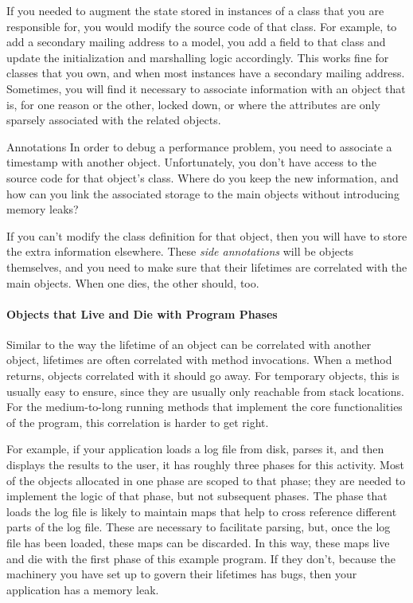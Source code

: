 If you needed to augment the state stored in instances of a class that you are
responsible for, you would modify the source code of that class. For example, to
add a secondary mailing address to a  model, you add a field to
that class and update the initialization and marshalling logic accordingly. This
works fine for classes that you own, and when most  instances have
a secondary mailing address. Sometimes, you will find it necessary to associate
information with an object that is, for one reason or the other, locked down, or
where the attributes are only sparsely associated with the related objects.

\begin{example}{Annotations}
In order to debug a performance problem, you need to associate a timestamp with
another object. Unfortunately, you don't have access to the source code for
that object's class. Where do you keep the new information, and how can you
link the associated storage to the main objects without introducing memory
leaks?
\end{example}

If you can't modify the class definition for that object, then you will have to
store the extra information elsewhere. These \emph{side annotations} will be objects themselves, and you need to make sure that their
lifetimes are correlated with the main objects. When one dies, the other
should, too.

\paragraph{Objects that Live and Die with Program Phases}
\label{sec:correlated-lifetime-2}

Similar to the way the lifetime of an object can be correlated with another
object, lifetimes are often correlated with method invocations. When a method
returns, objects correlated with it should go away. For temporary objects, this
is usually easy to ensure, since they are usually only reachable from stack
locations. For the medium-to-long running methods that implement the
core functionalities of the program, this correlation is harder to get right.

For example, if your application loads a log file from disk,
parses it, and then displays the results to the user, it has roughly three
phases for this activity. Most of the objects allocated in one phase are scoped to that
phase; they are needed to implement the logic of that phase, but not subsequent
phases. The phase that loads the log file is likely to maintain maps that
help to cross reference different parts of the log file. These are necessary
to facilitate parsing, but, once the log file has been loaded, these maps can be
discarded. In this way, these maps live and die with the first phase of this
example program. If they don't, because the machinery you have set up to
govern their lifetimes has bugs, then your application has a memory
leak.

